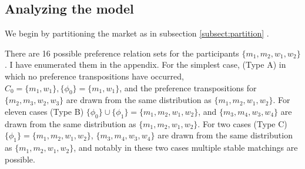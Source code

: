 \documentclass[WP]{AEA}
\begin{document}

\subsection{Analyzing the model}

We begin by partitioning the market as in subsection \ref{subsect:partition} . 

There are 16 possible preference relation sets for the participants $\{m_1,m_2,w_1,w_2\}$.  I have enumerated them in the appendix. For the simplest case, (Type A) in which no preference transpositions have occurred, $C_0 =\{m_1,w_1\}, \{\phi_0\}=\{m_1,w_1\}$, and the preference transpositions for  $\{m_2,m_3,w_2,w_3\}$ are drawn from the same distribution as $\{m_1,m_2,w_1,w_2\}$.  For eleven cases (Type B)  $ \{\phi_0\} \cup \{\phi_1\}=\{m_1,m_2,w_1,w_2\} $, and $\{m_3,m_4,w_3,w_4\}$ are drawn from the same distribution as $\{m_1,m_2,w_1,w_2\}$. For two cases (Type C)  $\{\phi_1\}=\{m_1,m_2,w_1,w_2\}$, $\{m_3,m_4,w_3,w_4\}$ are drawn from the same distribution as $\{m_1,m_2,w_1,w_2\}$, and notably in these two cases  multiple stable matchings are possible.
\end{document}

